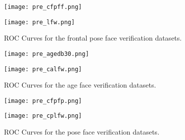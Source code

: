 \documentclass[class=report, crop=false, a4paper, 12pt]{standalone}
\begin{document}
\begin{figure}[H]
  \centering
  \begin{adjustbox}{center, minipage=1.2\textwidth, margin=0cm -0.1cm 0cm -0.1cm}  %
      \begin{minipage}[c]{0.49\textwidth}
          \centering
          \texttt{[image: pre\_cfpff.png]}
          \label{fig:roc_cfpff}
      \end{minipage}
      \hfill
      \begin{minipage}[c]{0.49\textwidth}
          \centering
          \texttt{[image: pre\_lfw.png]}
          \label{fig:roc_lfw}
      \end{minipage}
  \end{adjustbox}
  \vspace{-0.4cm}
  \caption{ROC Curves for the frontal pose face verification datasets.}
  \label{fig:roc_frontal}
\end{figure}

\begin{figure}[H]
  \begin{adjustbox}{center, minipage=1.2\textwidth, margin=0cm -0.1cm 0cm -0.1cm}  %
      \begin{minipage}[c]{0.49\textwidth}
          \centering
          \texttt{[image: pre\_agedb30.png]}
          \label{fig:roc_agedb30_a}
      \end{minipage}
      \hfill
      \begin{minipage}[c]{0.49\textwidth}
          \centering
          \texttt{[image: pre\_calfw.png]}
          \label{fig:roc_calfw_b}
      \end{minipage}
  \end{adjustbox}
  \vspace{-0.4cm}
  \caption{ROC Curves for the age face verification datasets.}
  \label{fig:roc_age}
\end{figure}

\begin{figure}[H]
  \begin{adjustbox}{center, minipage=1.2\textwidth, margin=0cm -0.1cm 0cm -0.1cm}  %
      \begin{minipage}[c]{0.49\textwidth}
          \centering
          \texttt{[image: pre\_cfpfp.png]}
          \label{fig:roc_cfpfp_a}
      \end{minipage}
      \hfill
      \begin{minipage}[c]{0.49\textwidth}
          \centering
          \texttt{[image: pre\_cplfw.png]}
          \label{fig:roc_cplfw_b}
      \end{minipage}
  \end{adjustbox}
  \vspace{-0.4cm}
  \caption{ROC Curves for the pose face verification datasets.}
  \label{fig:roc_pose}
\end{figure}
\end{document}
